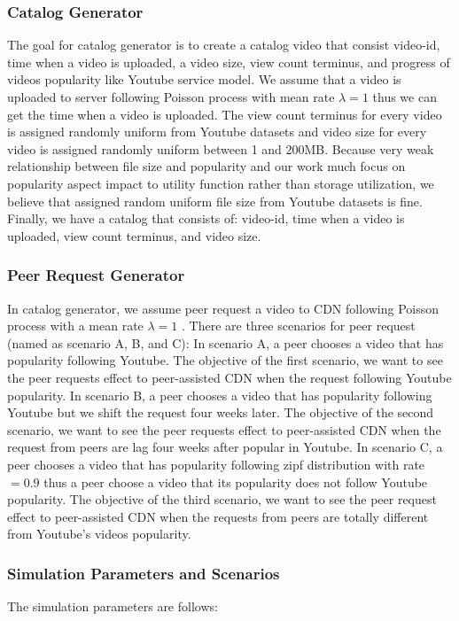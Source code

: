 \subsubsection{Catalog Generator}\label{catalog}
The goal for catalog generator is to create a catalog video that consist video-id, time when a video is uploaded, a video size, view count terminus, and progress of videos popularity like Youtube service model. 
We assume that a video is uploaded to server following Poisson process with mean rate $\lambda=1$ thus we can get the time when a video is uploaded. 
The view count terminus for every video is assigned randomly uniform from Youtube datasets and video size for every video is assigned randomly uniform between 1 and 200MB. 
Because very weak relationship between file size and popularity \cite{abhari2010workload} and our work much focus on popularity aspect impact to utility function rather than storage utilization, we believe that assigned random uniform file size from Youtube datasets is fine. 
Finally, we have a catalog that consists of: video-id, time when a video is uploaded, view count terminus, and video size.

\subsubsection{Peer Request Generator}\label{peerrequest}
In catalog generator, we assume peer request a video to CDN following Poisson process with a mean rate $\lambda=1$ \cite{Zink:2009:CYN:1502814.1502987}.
There are three scenarios for peer request (named as scenario A, B, and C):
In scenario A, a peer chooses a video that has popularity following Youtube.
The objective of the first scenario, we want to see the peer requests effect to peer-assisted CDN when the request following Youtube popularity. 
In scenario B, a peer chooses a video that has popularity following Youtube but we shift the request four weeks later.  
The objective of the second scenario, we want to see the peer requests effect to peer-assisted CDN when the request from peers are lag four weeks after popular in Youtube.
In scenario C, a peer chooses a video that has popularity following zipf distribution with rate$=0.9$ \cite{6654887} thus a peer choose a video that its popularity does not follow Youtube popularity.
The objective of the third scenario, we want to see the peer request effect to peer-assisted CDN when the requests from peers are totally different from Youtube's videos popularity.


\subsubsection{Simulation Parameters and Scenarios}
The simulation parameters are follows:

